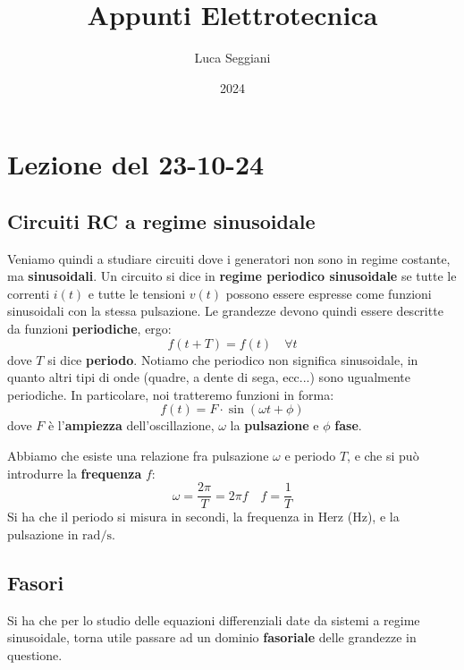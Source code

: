 \documentclass[a4paper,11pt]{article}
\title{Appunti Elettrotecnica}
\author{Luca Seggiani}
\date{2024}
\begin{document}
\section{Lezione del 23-10-24}

\thispagestyle{empty}
\pagestyle{fancy}

\subsection{Circuiti RC a regime sinusoidale}
Veniamo quindi a studiare circuiti dove i generatori non sono in regime costante, ma \textbf{sinusoidali}.
Un circuito si dice in \textbf{regime periodico sinusoidale} se tutte le correnti $i(t)$ e tutte le tensioni $v(t)$ possono essere espresse come funzioni sinusoidali con la stessa pulsazione.
Le grandezze devono quindi essere descritte da funzioni \textbf{periodiche}, ergo:
		$$ 
		f(t + T) = f(t) \quad \forall t
		$$
		dove $T$ si dice \textbf{periodo}.
		Notiamo che periodico non significa sinusoidale, in quanto altri tipi di onde (quadre, a dente di sega, ecc...) sono ugualmente periodiche.
	In particolare, noi tratteremo funzioni in forma:
	$$ 
		f(t) = F \cdot \sin(\omega t + \phi)	
	$$
	dove $F$ è l'\textbf{ampiezza} dell'oscillazione, $\omega$ la \textbf{pulsazione} e $\phi$ \textbf{fase}.

\begin{center}
\end{center}

	Abbiamo che esiste una relazione fra pulsazione $\omega$ e periodo $T$, e che si può introdurre la \textbf{frequenza} $f$:
	$$
	\omega = \frac{2\pi}{T} = 2\pi f \quad f = \frac{1}{T}
	$$
	Si ha che il periodo si misura in secondi, la frequenza in Herz ($\mathrm{Hz}$), e la pulsazione in $\mathrm{rad}/\mathrm{s}$.

\subsection{Fasori}
Si ha che per lo studio delle equazioni differenziali date da sistemi a regime sinusoidale, torna utile passare ad un dominio \textbf{fasoriale} delle grandezze in questione.
\end{document}
